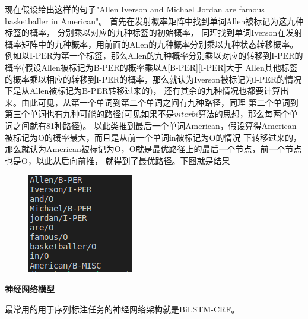 \documentclass[openany,oneside]{ctexbook}
\begin{document}
现在假设给出这样的句子"Allen Iverson and Michael Jordan are famous basketballer in American"。
首先在发射概率矩阵中找到单词Allen被标记为这九种标签的概率，
分别乘以对应的九种标签的初始概率，
同理找到单词Iverson在发射概率矩阵中的九种概率，用前面的Allen的九种概率分别乘以九种状态转移概率。
例如以I-PER为第一个标签，那么Allen的九种概率分别乘以对应的转移到I-PER的概率(假设Allen被标记为B-PER的概率乘以A[B-PER][I-PER]大于
Allen其他标签的概率乘以相应的转移到I-PER的概率，那么就认为Iverson被标记为I-PER的情况下是从Allen被标记为B-PER转移过来的)，
还有其余的九种情况也都要计算出来。由此可见，从第一个单词到第二个单词之间有九种路径，同理
第二个单词到第三个单词也有九种可能的路径(可见如果不是$viterbi$算法的思想，那么每两个单词之间就有81种路径)。
以此类推到最后一个单词American，假设算得American被标记为O的概率最大，而且是从前一个单词in被标记为O的情况
下转移过来的，那么就认为American被标记为O，O就是最优路径上的最后一个节点，前一个节点也是O，以此从后向前推，
就得到了最优路径。下图就是结果
\begin{figure}[htp]
   \centering
   \includegraphics[scale=1.2]{print.png}
   
\end{figure}


{\bfseries 神经网络模型}

最常用的用于序列标注任务的神经网络架构就是BiLSTM-CRF。
\end{document}
